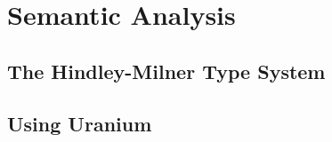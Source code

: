 \chapter{Semantic Analysis}
\label{chap:semantic_analysis}

\section{The Hindley-Milner Type System}

\section{Using Uranium}